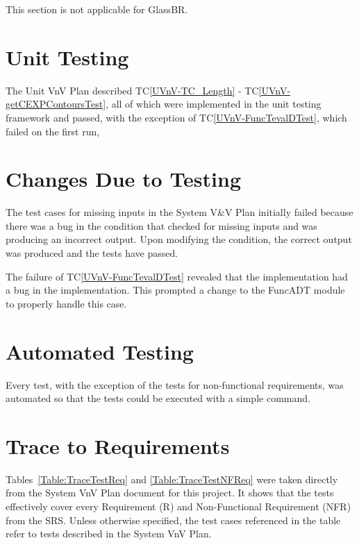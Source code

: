 \documentclass[12pt, titlepage]{article}
\newcommand{\progname}{GlassBR}
\newcommand{\tcref}[1]{TC\ref{#1}}
\begin{document}
This section is not applicable for \progname{}.
	
\section{Unit Testing}  \label{sec_UnitTests}
The Unit VnV Plan described \tcref{UVnV-TC_Length} - 
\tcref{UVnV-getCEXPContoursTest}, all of which were implemented in the unit testing 
framework and passed, with the exception of 
\tcref{UVnV-FuncTevalDTest}, which failed on the first run, 

\section{Changes Due to Testing} \label{sec_Changes}



The test cases for missing inputs in the System V\&V Plan initially failed 
because there was a bug in the condition that checked for missing inputs and 
was producing an incorrect output. Upon modifying the condition, the correct 
output was produced and the tests have passed.

The failure of \tcref{UVnV-FuncTevalDTest} revealed that the 
implementation had a bug in the implementation. This prompted a 
change to the FuncADT module to properly handle this case. 

\section{Automated Testing} \label{AutomatedTesting}

Every test, with the exception of the tests 
for non-functional requirements, was automated so that the tests could be 
executed with a simple command.

\section{Trace to Requirements} \label{sec_TraceReq}

Tables~\ref{Table:TraceTestReq} and \ref{Table:TraceTestNFReq} were taken 
directly from the System VnV Plan document for this project. It shows that the 
tests effectively cover every Requirement (R) and Non-Functional Requirement 
(NFR) from the SRS. Unless otherwise specified, the test cases referenced in 
the table refer to tests described in the System VnV Plan.
\end{document}
